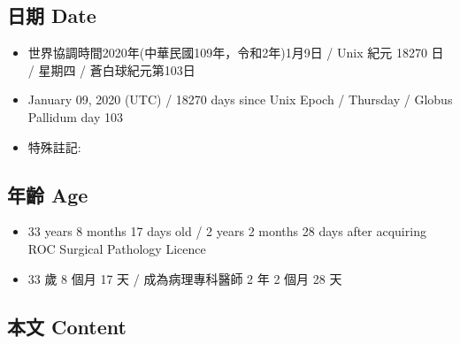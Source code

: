 \documentclass[
]{article}
\providecommand{\tightlist}{%
  \setlength{\itemsep}{0pt}\setlength{\parskip}{0pt}}
\begin{document}
\hypertarget{ux65e5ux671f-date-8}{%
\subsection{日期 Date}\label{ux65e5ux671f-date-8}}

\begin{itemize}
\tightlist
\item
  世界協調時間2020年(中華民國109年，令和2年)1月9日 / Unix 紀元 18270 日
  / 星期四 / 蒼白球紀元第103日
\item
  January 09, 2020 (UTC) / 18270 days since Unix Epoch / Thursday /
  Globus Pallidum day 103
\item
  特殊註記:
\end{itemize}

\hypertarget{ux5e74ux9f61-age-8}{%
\subsection{年齡 Age}\label{ux5e74ux9f61-age-8}}

\begin{itemize}
\tightlist
\item
  33 years 8 months 17 days old / 2 years 2 months 28 days after
  acquiring ROC Surgical Pathology Licence
\item
  33 歲 8 個月 17 天 / 成為病理專科醫師 2 年 2 個月 28 天
\end{itemize}

\hypertarget{ux672cux6587-content-8}{%
\subsection{本文 Content}\label{ux672cux6587-content-8}}
\end{document}
